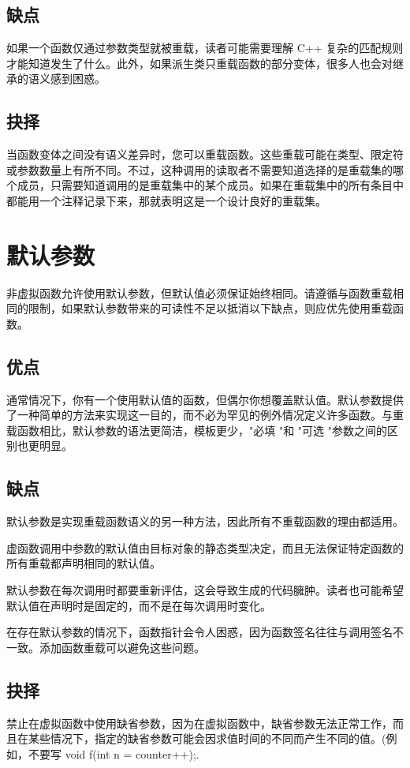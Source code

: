 \subsection{缺点}
如果一个函数仅通过参数类型就被重载，读者可能需要理解 C++ 复杂的匹配规则才能知道发生了什么。此外，如果派生类只重载函数的部分变体，很多人也会对继承的语义感到困惑。


\subsection{抉择}
当函数变体之间没有语义差异时，您可以重载函数。这些重载可能在类型、限定符或参数数量上有所不同。不过，这种调用的读取者不需要知道选择的是重载集的哪个成员，只需要知道调用的是重载集中的某个成员。如果在重载集中的所有条目中都能用一个注释记录下来，那就表明这是一个设计良好的重载集。


\section{默认参数}
非虚拟函数允许使用默认参数，但默认值必须保证始终相同。请遵循与函数重载相同的限制，如果默认参数带来的可读性不足以抵消以下缺点，则应优先使用重载函数。


\subsection{优点}
通常情况下，你有一个使用默认值的函数，但偶尔你想覆盖默认值。默认参数提供了一种简单的方法来实现这一目的，而不必为罕见的例外情况定义许多函数。与重载函数相比，默认参数的语法更简洁，模板更少，"必填 "和 "可选 "参数之间的区别也更明显。


\subsection{缺点}
默认参数是实现重载函数语义的另一种方法，因此所有不重载函数的理由都适用。

虚函数调用中参数的默认值由目标对象的静态类型决定，而且无法保证特定函数的所有重载都声明相同的默认值。

默认参数在每次调用时都要重新评估，这会导致生成的代码臃肿。读者也可能希望默认值在声明时是固定的，而不是在每次调用时变化。

在存在默认参数的情况下，函数指针会令人困惑，因为函数签名往往与调用签名不一致。添加函数重载可以避免这些问题。


\subsection{抉择}
禁止在虚拟函数中使用缺省参数，因为在虚拟函数中，缺省参数无法正常工作，而且在某些情况下，指定的缺省参数可能会因求值时间的不同而产生不同的值。(例如，不要写 void f(int n = counter++);.

